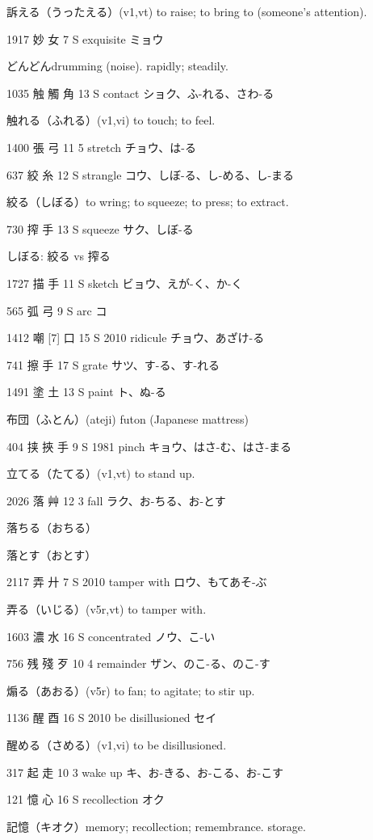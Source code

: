訴える（うったえる）(v1,vt) to raise; to bring to (someone's attention).

1917	妙		女	7	S		exquisite	ミョウ

どんどんdrumming (noise). rapidly; steadily.

1035	触	觸	角	13	S		contact	ショク、ふ-れる、さわ-る

触れる（ふれる）(v1,vi) to touch; to feel.

1400	張		弓	11	5		stretch	チョウ、は-る

637	絞		糸	12	S		strangle	コウ、しぼ-る、し-める、し-まる

絞る（しぼる）to wring; to squeeze; to press; to extract.

730	搾		手	13	S		squeeze	サク、しぼ-る

しぼる:
絞る vs 搾る

1727	描		手	11	S		sketch	ビョウ、えが-く、か-く

565	弧		弓	9	S		arc	コ

1412	嘲 [7]		口	15	S	2010	ridicule	チョウ、あざけ-る

741	擦		手	17	S		grate	サツ、す-る、す-れる

1491	塗		土	13	S		paint	ト、ぬ-る

布団（ふとん）(ateji) futon (Japanese mattress)

404	挟	挾	手	9	S	1981	pinch	キョウ、はさ-む、はさ-まる

立てる（たてる）(v1,vt) to stand up.

2026	落		艸	12	3		fall	ラク、お-ちる、お-とす

落ちる（おちる）

落とす（おとす）

2117	弄		廾	7	S	2010	tamper with	ロウ、もてあそ-ぶ

弄る（いじる）(v5r,vt) to tamper with.

1603	濃		水	16	S		concentrated	ノウ、こ-い

756	残	殘	歹	10	4		remainder	ザン、のこ-る、のこ-す

煽る（あおる）(v5r) to fan; to agitate; to stir up.

1136	醒		酉	16	S	2010	be disillusioned	セイ

醒める（さめる）(v1,vi) to be disillusioned.

317	起		走	10	3		wake up	キ、お-きる、お-こる、お-こす

121	憶		心	16	S		recollection	オク

記憶（キオク）memory; recollection; remembrance. storage.

